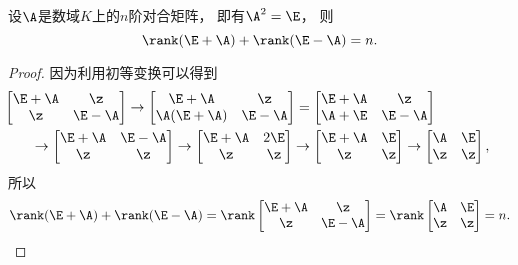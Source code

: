 \begin{example}\label{example:对合矩阵.对合矩阵的秩的性质1}
设\(\A\)是数域\(K\)上的\(n\)阶对合矩阵，
即有\(\A^2=\E\)，
则\[
	\rank(\E+\A)+\rank(\E-\A)=n.
\]
\begin{proof}
因为利用初等变换可以得到\begin{align*}
	&\hspace{-20pt}
	\begin{bmatrix}
		\E+\A & \z \\
		\z & \E-\A
	\end{bmatrix}
	\to \begin{bmatrix}
		\E+\A & \z \\
		\A(\E+\A) & \E-\A
	\end{bmatrix}
	= \begin{bmatrix}
		\E+\A & \z \\
		\A+\E & \E-\A
	\end{bmatrix} \\
	&\to \begin{bmatrix}
		\E+\A & \E-\A \\
		\z & \z
	\end{bmatrix}
	\to \begin{bmatrix}
		\E+\A & 2\E \\
		\z & \z
	\end{bmatrix}
	\to \begin{bmatrix}
		\E+\A & \E \\
		\z & \z
	\end{bmatrix}
	\to \begin{bmatrix}
		\A & \E \\
		\z & \z
	\end{bmatrix},
\end{align*}
所以\[
	\rank(\E+\A)+\rank(\E-\A)
	=\rank\begin{bmatrix}
		\E+\A & \z \\
		\z & \E-\A
	\end{bmatrix}
	= \rank\begin{bmatrix}
		\A & \E \\
		\z & \z
	\end{bmatrix}
	= n.
	\qedhere
\]
\end{proof}
\end{example}

